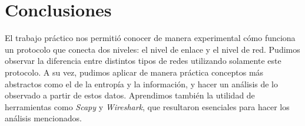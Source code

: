 \section{Conclusiones}

El trabajo pr\'actico nos permiti\'o conocer de manera experimental c\'omo funciona un protocolo que conecta dos niveles: el nivel de enlace y el nivel de red. Pudimos observar la diferencia entre distintos tipos de redes utilizando solamente este protocolo. A su vez, pudimos aplicar de manera pr\'actica conceptos m\'as abstractos como el de la entrop\'ia y la informaci\'on, y hacer un an\'alisis de lo observado a partir de estos datos. Aprendimos tambi\'en la utilidad de herramientas como \emph{Scapy} y \emph{Wireshark}, que resultaron esenciales para hacer los an\'alisis mencionados.

